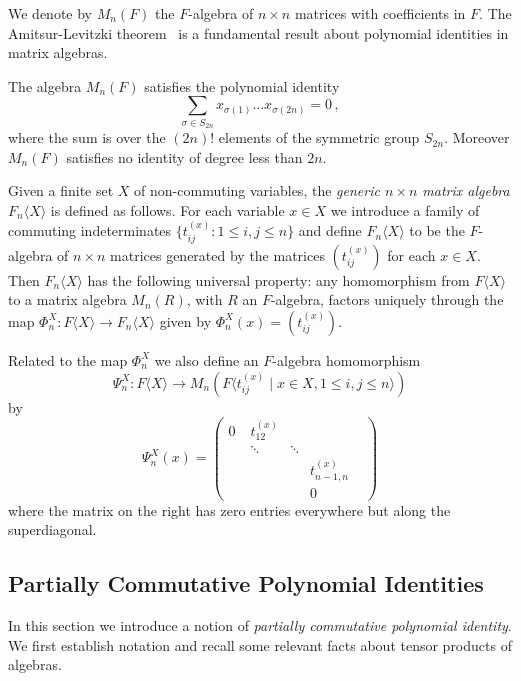 \documentclass[runningheads]{llncs}
\begin{document}
We denote by $M_n(F)$ the $F$-algebra of $n\times n$ matrices with
coefficients in $F$.  The Amitsur-Levitzki theorem~\cite{AL50,Cohn03}
is a fundamental result about polynomial identities in matrix
algebras.
\begin{theorem}
The algebra $M_n(F)$ satisfies the polynomial identity
\[ \sum_{\sigma \in S_{2n}} x_{\sigma(1)}\ldots x_{\sigma(2n)} = 0 \, ,\]
where the sum is over the $(2n)!$ elements of the symmetric group $S_{2n}$.
Moreover $M_n(F)$ satisfies no identity of degree less than $2n$.
\label{thm:AL}
\end{theorem}


Given a finite set $X$ of non-commuting variables, the \emph{generic
  $n\times n$ matrix algebra} $F_n\langle X\rangle$ is defined as
follows.  For each variable $x\in X$ we introduce a family of
commuting indeterminates $\{ t^{(x)}_{ij} : 1 \leq i,j \leq n\}$ and
define $F_n\langle X\rangle$ to be the $F$-algebra of $n\times n$
matrices generated by the matrices $(t^{(x)}_{ij})$ for each $x \in X$.
Then $F_n\langle X\rangle$ has the following universal property: any
homomorphism from $F \langle X \rangle$ to a matrix algebra $M_n(R)$,
with $R$ an $F$-algebra, factors uniquely through the map $\Phi^X_n :
F \langle X \rangle \rightarrow F_n \langle X \rangle$ given by
$\Phi^X_n(x)= (t^{(x)}_{ij})$.  

Related to the map $\Phi^X_n$ we also define an $F$-algebra homomorphism
\[ \Psi^X_n : F \langle X \rangle \rightarrow M_n(F\langle t_{ij}^{(x)}
\mid x \in X, 1 \leq i,j \leq n \rangle) \]
by 
 \[ \Psi^X_n(x) = \left( 
\begin{array}{rlllc} 
              0 \; & t_{12}^{(x)}    &        & &\\
                   & \ddots              & \ddots & &\\
                   &                    & & t^{(x)}_{n-1,n} \\
                   &                    & &   0
\end{array}\right) \]
where the matrix on the right has zero entries everywhere but along
the superdiagonal.

\subsection{Partially Commutative Polynomial Identities}
In this section we introduce a notion of \emph{partially commutative
  polynomial identity}.  We first establish notation and recall some
relevant facts about tensor products of algebras.  
\end{document}
